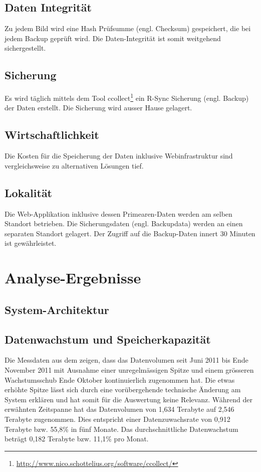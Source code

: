 \subsection{Daten Integrität}
Zu jedem Bild wird eine Hash Prüfsumme (engl. Checksum) gespeichert, die bei jedem Backup geprüft wird. Die Daten-Integrität ist somit weitgehend sichergestellt.

\subsection{Sicherung}
Es wird täglich mittels dem Tool ccollect\footnote{\url{http://www.nico.schottelius.org/software/ccollect/}} ein R-Sync Sicherung (engl. Backup) der Daten erstellt. Die Sicherung wird ausser Hause gelagert.

\subsection{Wirtschaftlichkeit}
Die Kosten für die Speicherung der Daten inklusive Webinfrastruktur sind vergleichsweise zu alternativen Lösungen tief.

\subsection{Lokalität}

Die Web-Applikation inklusive dessen \gls{Primearen-Daten} werden am selben Standort betrieben. Die Sicherungsdaten (engl. Backupdata) werden an einen separaten Standort gelagert. Der Zugriff auf die Backup-Daten innert 30 Minuten ist gewährleistet.

\section{Analyse-Ergebnisse}

\subsection{System-Architektur}

\subsection{Datenwachstum und Speicherkapazität}
Die Messdaten aus dem  zeigen, dass das Datenvolumen seit Juni 2011 bis Ende November 2011 mit Ausnahme einer unregelmässigen Spitze und einem grösseren Wachstumsschub Ende Oktober kontinuierlich zugenommen hat. Die etwas erhöhte Spitze lässt sich durch eine vorübergehende technische Änderung am System erklären und hat somit für die Auswertung keine Relevanz. Während der erwähnten Zeitspanne hat das Datenvolumen von 1,634 Terabyte auf 2,546 Terabyte zugenommen. Dies entspricht einer Datenzuwachsrate von 0,912 Terabyte bzw. 55,8\% in fünf Monate. Das durchschnittliche Datenwachstum beträgt 0,182 Terabyte bzw. 11,1\% pro Monat.

